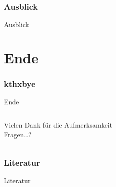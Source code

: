 \documentclass[ngerman,compress,hyperref={bookmarks}]{beamer}
\begin{document}
\section{Ausblick}
\begin{frame}{Ausblick}
\end{frame}

\part{Ende}
\section{kthxbye}
\begin{frame}[plain]{Ende}
\begin{columns}[t]
\begin{column}{0.5\textwidth}
 \begin{center}
 \vspace{1cm}
 Vielen Dank für die Aufmerksamkeit\\
 \vspace{1.5cm}
 Fragen\ldots?
 \end{center}
\end{column}
\begin{column}{0.5\textwidth}
 \vspace{-1cm}
\end{column}
\end{columns}
\end{frame}

\section{Literatur}
\begin{frame}{Literatur}
\scriptsize


\end{frame}
\end{document}
